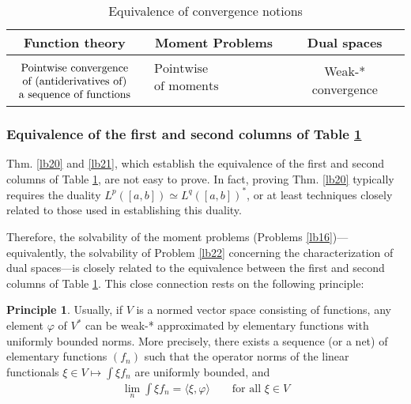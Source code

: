 \documentclass[12pt,b5paper,notitlepage]{article}
\theoremstyle{definition}
\newtheorem{principle}[df]{Principle}
\theoremstyle{plain}
\newcommand{\bk}[1]{\langle {#1}\rangle}
\numberwithin{equation}{section}
\begin{document}
\begin{table}[H]
\centering
 \begin{tabular}{|c|c|c|}
    \hline \rule{0pt}{0.45cm}
Function theory & Moment Problems & Dual spaces\\
\hline 
$\begin{array}{c}
\rule{0pt}{0.45cm}\text{Pointwise convergence} \\
\text{of (antiderivatives of)}\\
\text{a sequence of functions}
\end{array}$
& 
$\begin{array}{c}
\text{Pointwise convergence} \\
\text{of moments}\\
\end{array}$
 & Weak-* convergence\\
\hline
  \end{tabular}
\caption{Equivalence of convergence notions}\label{tb1}
\end{table}


\subsubsection{Equivalence of the first and second columns of Table \ref{tb1}}\label{lb107}



Thm. \ref{lb20} and \ref{lb21}, which establish the equivalence of the first and second columns of Table \ref{tb1}, are not easy to prove. In fact, proving Thm. \ref{lb20} typically requires the duality $L^p([a,b])\simeq L^q([a,b])^*$, or at least techniques closely related to those used in establishing this duality. 


Therefore, the solvability of the moment problems (Problems \ref{lb16})---equivalently, the solvability of Problem \ref{lb22} concerning the characterization of dual spaces---is closely related to the equivalence between the first and second columns of Table \ref{tb1}. This close connection rests on the following principle:

\begin{principle}\label{lb23}
Usually, if $V$ is a normed vector space consisting of functions,  any element $\varphi$ of $V^*$ can be weak-* approximated by elementary functions with uniformly bounded norms. More precisely, there exists a sequence (or a net) of elementary functions $(f_n)$ such that the operator norms of the linear functionals $\xi\in V\mapsto\int \xi f_n$ are uniformly bounded, and
\begin{align*}
\lim_n \int\xi f_n=\bk{\xi,\varphi}\qquad\text{for all }\xi\in V
\end{align*}
\end{principle}
\end{document}
